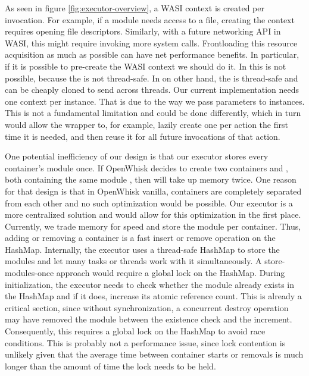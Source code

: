 As seen in figure \ref{fig:executor-overview}, a WASI context is created per  invocation. For example, if a module needs access to a file, creating the context requires opening file descriptors. Similarly, with a future networking API in WASI, this might require invoking more system calls. Frontloading this resource acquisition as much as possible can have net performance benefits. In particular, if it is possible to pre-create the WASI context we should do it. In  this is not possible, because the  is not thread-safe. In  on other hand, the  is thread-safe and can be cheaply cloned to send across threads. Our current implementation needs one context per instance. That is due to the way we pass parameters to instances. This is not a fundamental limitation and could be done differently, which in turn would allow the  wrapper to, for example, lazily create one  per action the first time it is needed, and then reuse it for all future invocations of that action.

One potential inefficiency of our design is that our executor stores every container's module once. If OpenWhisk decides to create two containers  and , both containing the same module , then  will take up memory twice. One reason for that design is that in OpenWhisk vanilla, containers are completely separated from each other and no such optimization would be possible. Our executor is a more centralized solution and would allow for this optimization in the first place. Currently, we trade memory for speed and store the module per container. Thus, adding or removing a container is a fast insert or remove operation on the HashMap.
Internally, the executor uses a thread-safe HashMap to store the modules and let many tasks or threads work with it simultaneously. A store-modules-once approach would require a global lock on the HashMap. During initialization, the executor needs to check whether the module already exists in the HashMap and if it does, increase its atomic reference count. This is already a critical section, since without synchronization, a concurrent destroy operation may have removed the module between the existence check and the increment. Consequently, this requires a global lock on the HashMap to avoid race conditions. This is probably not a performance issue, since lock contention is unlikely given that the average time between container starts or removals is much longer than the amount of time the lock needs to be held.

